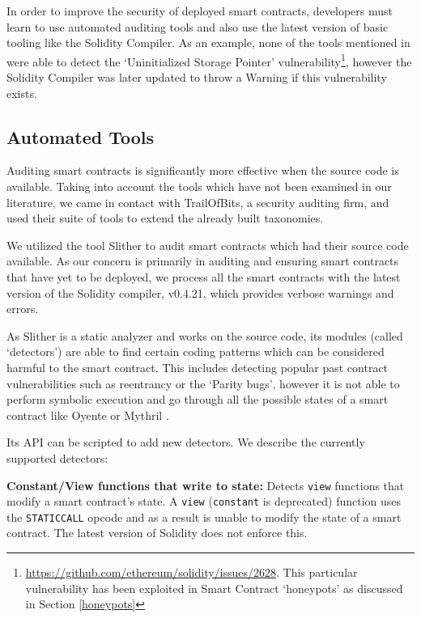 In order to improve the security of deployed smart contracts, developers must learn to use automated auditing tools and also use the latest version of basic tooling like the Solidity Compiler. As an example, none of the tools mentioned in \cite{tools} were able to detect the `Uninitialized Storage Pointer' vulnerability\footnote{\url{https://github.com/ethereum/solidity/issues/2628}. This particular vulnerability has been exploited in Smart Contract `honeypots' as discussed in Section \ref{honeypots}}, however the Solidity Compiler was later updated to throw a Warning if this vulnerability exists. 

\subsection{Automated Tools}\label{slither}

Auditing smart contracts is significantly more effective when the source code is available. Taking into account the tools which have not been examined in our literature, we came in contact with TrailOfBits, a security auditing firm, and used their suite of tools to extend the already built taxonomies.

We utilized the tool Slither %
to audit smart contracts which had their source code available. As our concern is primarily in auditing and ensuring smart contracts that have yet to be deployed, we process all the smart contracts with the latest version of the Solidity compiler, v0.4.21, which provides verbose warnings and errors. 

As Slither is a static analyzer and works on the source code, its modules (called `detectors') are able to find certain coding patterns which can be considered harmful to the smart contract. This includes detecting popular past contract vulnerabilities such as reentrancy or the `Parity bugs', however it is not able to perform symbolic execution and go through all the possible states of a smart contract like Oyente \cite{Luu:2016:MSC:2976749.2978309} or Mythril \cite{mythril}. 

Its API can be scripted to add new detectors. We describe the currently supported detectors:

\textbf{Constant/View functions that write to state:} Detects \texttt{view} functions that modify a smart contract's state. A \texttt{view} (\texttt{constant} is deprecated) function uses the \texttt{STATICCALL} opcode \cite{staticcall} and as a result is unable to modify the state of a smart contract. The latest version of Solidity does not enforce this.

